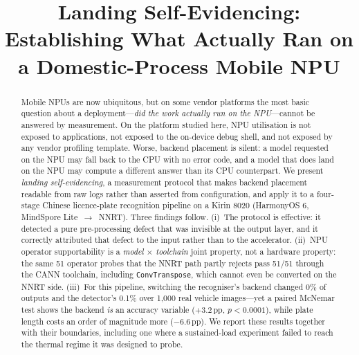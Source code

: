 \documentclass[conference]{IEEEtran}
\begin{document}
\title{Landing Self-Evidencing:\\
Establishing What Actually Ran on a Domestic-Process Mobile NPU}

\author{
}

\maketitle

\begin{abstract}
Mobile NPUs are now ubiquitous, but on some vendor platforms the most basic
question about a deployment---\emph{did the work actually run on the NPU}---cannot
be answered by measurement. On the platform studied here, NPU utilisation is not
exposed to applications, not exposed to the on-device debug shell, and not
exposed by any vendor profiling template. Worse, backend placement is silent:
a model requested on the NPU may fall back to the CPU with no error code, and a
model that does land on the NPU may compute a different answer than its CPU
counterpart. We present \emph{landing self-evidencing}, a measurement protocol
that makes backend placement readable from raw logs rather than asserted from
configuration, and apply it to a four-stage Chinese licence-plate recognition
pipeline on a Kirin 8020 (HarmonyOS 6, MindSpore Lite~$\rightarrow$~NNRT). Three
findings follow. (i)~The protocol is effective: it detected a pure
pre-processing defect that was invisible at the output layer, and it correctly
attributed that defect to the input rather than to the accelerator.
(ii)~NPU operator supportability is a \emph{model $\times$ toolchain} joint
property, not a hardware property: the same 51 operator probes that the NNRT
path partly rejects pass 51/51 through the CANN toolchain, including
\texttt{ConvTranspose}, which cannot even be converted on the NNRT side.
(iii)~For this pipeline, switching the recogniser's backend changed 0\% of
outputs and the detector's 0.1\% over 1{,}000 real vehicle images---yet a paired
McNemar test shows the backend \emph{is} an accuracy variable
($+3.2$\,pp, $p<0.0001$), while plate length costs an order of magnitude more
($-6.6$\,pp). We report these results together with their boundaries, including
one where a sustained-load experiment failed to reach the thermal regime it was
designed to probe.
\end{abstract}
\end{document}
